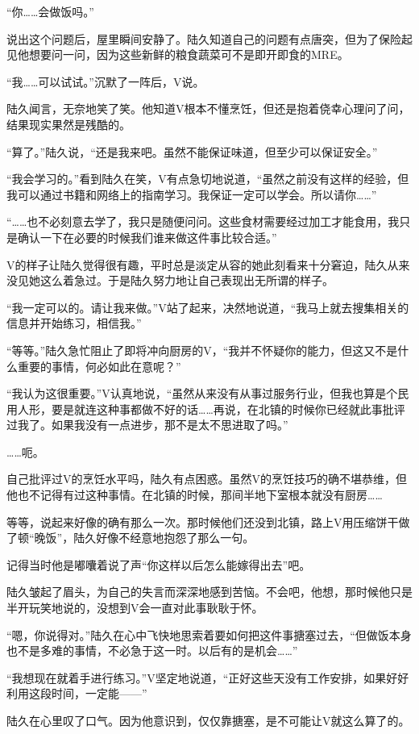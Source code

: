 “你……会做饭吗。”

说出这个问题后，屋里瞬间安静了。陆久知道自己的问题有点唐突，但为了保险起见他想要问一问，因为这些新鲜的粮食蔬菜可不是即开即食的MRE。

“我……可以试试。”沉默了一阵后，V说。

陆久闻言，无奈地笑了笑。他知道V根本不懂烹饪，但还是抱着侥幸心理问了问，结果现实果然是残酷的。

“算了。”陆久说，“还是我来吧。虽然不能保证味道，但至少可以保证安全。”

“我会学习的。”看到陆久在笑，V有点急切地说道，“虽然之前没有这样的经验，但我可以通过书籍和网络上的指南学习。我保证一定可以学会。所以请你……”

“……也不必刻意去学了，我只是随便问问。这些食材需要经过加工才能食用，我只是确认一下在必要的时候我们谁来做这件事比较合适。”

V的样子让陆久觉得很有趣，平时总是淡定从容的她此刻看来十分窘迫，陆久从来没见她这么着急过。于是陆久努力地让自己表现出无所谓的样子。

“我一定可以的。请让我来做。”V站了起来，决然地说道，“我马上就去搜集相关的信息并开始练习，相信我。”

“等等。”陆久急忙阻止了即将冲向厨房的V，“我并不怀疑你的能力，但这又不是什么重要的事情，何必如此在意呢？”

“我认为这很重要。”V认真地说，“虽然从来没有从事过服务行业，但我也算是个民用人形，要是就连这种事都做不好的话……再说，在北镇的时候你已经就此事批评过我了。如果我没有一点进步，那不是太不思进取了吗。”

……呃。

自己批评过V的烹饪水平吗，陆久有点困惑。虽然V的烹饪技巧的确不堪恭维，但他也不记得有过这种事情。在北镇的时候，那间半地下室根本就没有厨房……

等等，说起来好像的确有那么一次。那时候他们还没到北镇，路上V用压缩饼干做了顿“晚饭”，陆久好像不经意地抱怨了那么一句。

记得当时他是嘟囔着说了声“你这样以后怎么能嫁得出去”吧。

陆久皱起了眉头，为自己的失言而深深地感到苦恼。不会吧，他想，那时候他只是半开玩笑地说的，没想到V会一直对此事耿耿于怀。

“嗯，你说得对。”陆久在心中飞快地思索着要如何把这件事搪塞过去，“但做饭本身也不是多难的事情，不必急于这一时。以后有的是机会……”

“我想现在就着手进行练习。”V坚定地说道，“正好这些天没有工作安排，如果好好利用这段时间，一定能——”

陆久在心里叹了口气。因为他意识到，仅仅靠搪塞，是不可能让V就这么算了的。

